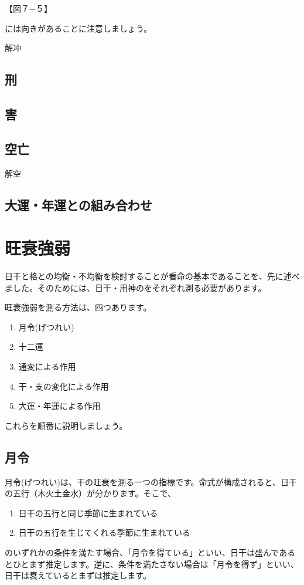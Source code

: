 \documentclass[a5paper,11pt,dvipdfmx]{tarticle}
\begin{document}
【図７−５】

には向きがあることに注意しましょう。



解冲


\subsection{刑}


\subsection{害}


\subsection{空亡}


解空


\subsection{大運・年運との組み合わせ}



\clearpage

\section{旺衰強弱}

日干と格との均衡・不均衡を検討することが看命の基本であることを、先に述べました。そのためには、日干・用神のをそれぞれ測る必要があります。

旺衰強弱を測る方法は、四つあります。

\begin{enumerate}
\item 月令(げつれい)
\item 十二運
  \item 通変による作用
\item 干・支の変化による作用
\item 大運・年運による作用
\end{enumerate}

これらを順番に説明しましょう。

\subsection{月令}
月令(げつれい)は、干の旺衰を測る一つの指標です。命式が構成されると、日干の五行（木火土金水）が分かります。そこで、
\begin{enumerate}
\item 日干の五行と同じ季節に生まれている
\item 日干の五行を生じてくれる季節に生まれている
\end{enumerate}
のいずれかの条件を満たす場合、「月令を得ている」といい、日干は盛んであるとひとまず推定します。逆に、条件を満たさない場合は「月令を得ず」といい、日干は衰えているとまずは推定します。
\end{document}

